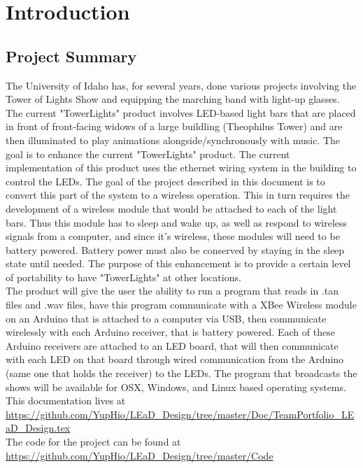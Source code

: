 \documentclass[12pt]{article}
\begin{document}
	\tableofcontents
	\newpage
	
	\section{Introduction}
	
		\subsection{Project Summary}
		The University of Idaho has, for several years, done various projects involving the Tower of Lights Show and equipping the marching band with light-up glasses. The current "TowerLights" product involves LED-based light bars that are placed in front of front-facing widows of a large buildling (Theophilus Tower) and are then illuminated to play animations alongside/synchronously with music. The goal is to enhance the current "TowerLights" product. The current implementation of this product uses the ethernet wiring system in the building to control the LEDs. The goal of the project described in this document is to convert this part of the system to a wireless operation. This in turn requires the development of a wireless module that would be attached to each of the light bars. Thus this module has to sleep and wake up, as well as respond to wireless signals from a computer, and since it's wireless, these modules will need to be battery powered. Battery power must also be conserved by staying in the sleep state until needed. The purpose of this enhancement is to provide a certain level of portability to have "TowerLights" at other locations. \\
		The product will give the user the ability to run a program that reads in .tan files and .wav files, have this program communicate with a XBee Wireless module on an Arduino that is attached to a computer via USB, then communicate wirelessly with each Arduino receiver, that is battery powered. Each of these Arduino receivers are attached to an LED board, that will then communicate with each LED on that board through wired communication from the Arduino (same one that holds the receiver) to the LEDs. The program that broadcasts the shows will be available for OSX, Windows, and Linux based operating systems.\\
		This documentation lives at \url{https://github.com/YupHio/LEaD_Design/tree/master/Doc/TeamPortfolio_LEaD_Design.tex} \\
		The code for the project can be found at \url{https://github.com/YupHio/LEaD_Design/tree/master/Code}
		
\end{document}
